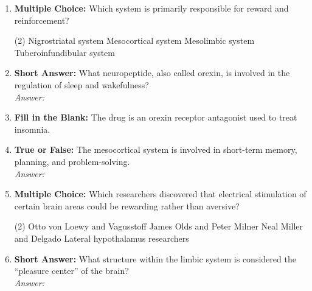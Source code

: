 \begin{enumerate}[label=\textbf{Q3.5.\arabic*}]
    \item \textbf{Multiple Choice:} Which system is primarily responsible for reward and reinforcement?
        \begin{tasks}[label=\textcolor{\documentTheme}{(\Alph*)}, item-format=\color{\documentTheme}, label-width=1.5em, item-indent=1.7em](2)
            \task Nigrostriatal system
            \task Mesocortical system
            \task Mesolimbic system
            \task Tuberoinfundibular system
        \end{tasks}

    \item \textbf{Short Answer:} What neuropeptide, also called orexin, is involved in the regulation of sleep and wakefulness? \\
        \textit{Answer:} %

    \item \textbf{Fill in the Blank:} The drug \underline{\hspace{3cm}} is an orexin receptor antagonist used to treat insomnia.

    \item \textbf{True or False:} The mesocortical system is involved in short-term memory, planning, and problem-solving. \\
        \textit{Answer:} %

    \item \textbf{Multiple Choice:} Which researchers discovered that electrical stimulation of certain brain areas could be rewarding rather than aversive?
        \begin{tasks}[label=\textcolor{\documentTheme}{(\Alph*)}, item-format=\color{\documentTheme}, label-width=1.5em, item-indent=1.7em](2)
            \task Otto von Loewy and Vagusstoff
            \task James Olds and Peter Milner
            \task Neal Miller and Delgado
            \task Lateral hypothalamus researchers
        \end{tasks}

    \item \textbf{Short Answer:} What structure within the limbic system is considered the ``pleasure center'' of the brain? \\
        \textit{Answer:} %
\end{enumerate}